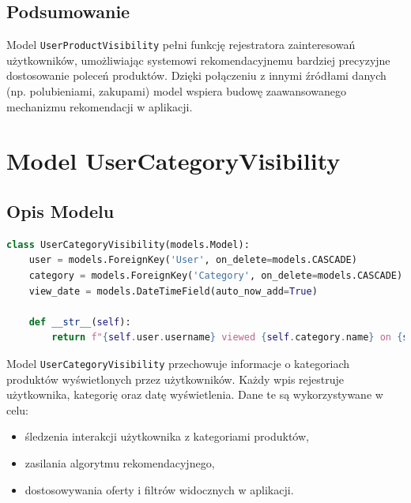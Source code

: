\documentclass[12pt,a4paper,oneside]{article}
\theoremstyle{definition}
\numberwithin{equation}{section}
\begin{document}
\subsection{Podsumowanie}
Model \texttt{UserProductVisibility} pełni funkcję rejestratora zainteresowań użytkowników, umożliwiając systemowi rekomendacyjnemu bardziej precyzyjne dostosowanie poleceń produktów. Dzięki połączeniu z innymi źródłami danych (np. polubieniami, zakupami) model wspiera budowę zaawansowanego mechanizmu rekomendacji w aplikacji.


% 
% 


\section{Model UserCategoryVisibility}

\subsection{Opis Modelu}
\begin{lstlisting}[language=Python]
class UserCategoryVisibility(models.Model):
    user = models.ForeignKey('User', on_delete=models.CASCADE)
    category = models.ForeignKey('Category', on_delete=models.CASCADE)
    view_date = models.DateTimeField(auto_now_add=True)

    def __str__(self):
        return f"{self.user.username} viewed {self.category.name} on {self.view_date}"
\end{lstlisting}

Model \texttt{UserCategoryVisibility} przechowuje informacje o kategoriach produktów wyświetlonych przez użytkowników. Każdy wpis rejestruje użytkownika, kategorię oraz datę wyświetlenia. Dane te są wykorzystywane w celu:
\begin{itemize}
    \item śledzenia interakcji użytkownika z kategoriami produktów,
    \item zasilania algorytmu rekomendacyjnego,
    \item dostosowywania oferty i filtrów widocznych w aplikacji.
\end{itemize}
\end{document}
